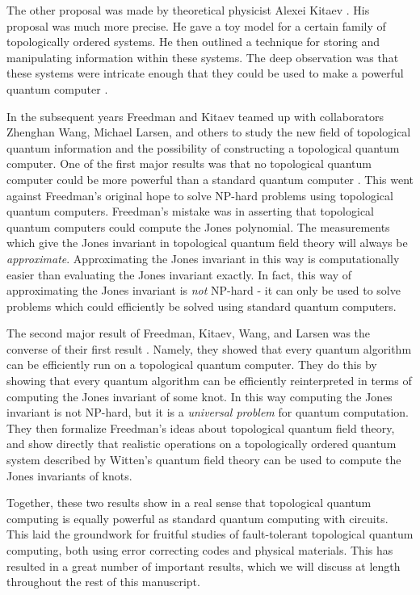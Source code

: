 The other proposal was made by theoretical physicist Alexei Kitaev \cite{kitaev2003fault}. His proposal was much more precise. He gave a toy model for a certain family of topologically ordered systems. He then outlined a technique for storing and manipulating information within these systems. The deep observation was that these systems were intricate enough that they could be used to make a powerful quantum computer \cite{mochon2003anyons}.

In the subsequent years Freedman and Kitaev teamed up with collaborators Zhenghan Wang, Michael Larsen, and others to study the new field of topological quantum information and the possibility of constructing a topological quantum computer. One of the first major results was that no topological quantum computer could be more powerful than a standard quantum computer \cite{freedman2002simulation}. This went against Freedman’s original hope to solve NP-hard problems using topological quantum computers. Freedman’s mistake was in asserting that topological quantum computers could compute the Jones polynomial. The measurements which give the Jones invariant in topological quantum field theory will always be {\em approximate}. Approximating the Jones invariant in this way is computationally easier than evaluating the Jones invariant exactly. In fact, this way of approximating the Jones invariant is \textit{not} NP-hard - it can only be used to solve problems which could efficiently be solved using standard quantum computers.

The second major result of Freedman, Kitaev, Wang, and Larsen was the converse of their first result \cite{freedman2002modular}. Namely, they showed that every quantum algorithm can be efficiently run on a topological quantum computer. They do this by showing that every quantum algorithm can be efficiently reinterpreted in terms of computing the Jones invariant of some knot. In this way computing the Jones invariant is not NP-hard, but it is a {\em universal problem} for quantum computation. They then formalize Freedman’s ideas about topological quantum field theory, and show directly that realistic operations on a topologically ordered quantum system described by Witten’s quantum field theory can be used to compute the Jones invariants of knots.

Together, these two results show in a real sense that topological quantum computing is equally powerful as standard quantum computing with circuits. This laid the groundwork for fruitful studies of fault-tolerant topological quantum computing, both using error correcting codes and physical materials. This has resulted in a great number of important results, which we will discuss at length throughout the rest of this manuscript.

